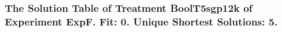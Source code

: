  \begin{frame}
 \fontsize{8pt}{9pt}\selectfont
 \frametitle{ The Solution Table of Treatment BoolT5sgp12k of Experiment ExpF. Fit: 0. Unique Shortest Solutions: 5. }

 \label{ExpFSolutionTable002.tex}  
 \end{frame}

